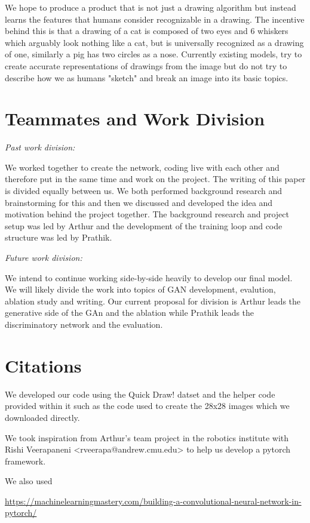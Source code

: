 \documentclass{article}
\begin{document}
We hope to produce a product that is not just a drawing algorithm but instead
learns the features that humans consider recognizable in a drawing. The incentive
behind this is that a drawing of a cat is composed of two eyes and 6 whiskers
which arguably look nothing like a cat, but is universally recognized as a drawing
of one, similarly a pig has two circles as a nose. Currently existing models,
try to create accurate representations of drawings from the image but do not
try to describe how we as humans "sketch" and break an image into its basic
topics.


\section{Teammates and Work Division}

\textit{Past work division:}

We worked together to create the network, coding live with each other and therefore put
in the same time and work on the project. The writing of this paper is divided equally
between us.
We both performed background research and brainstorming for this and then we
discussed and developed the idea and motivation behind the project together.
The background research and project setup was led by Arthur and the development
of the training loop and code structure was led by Prathik.

\textit{Future work division:}

We intend to continue working side-by-side heavily to develop our final model.
We will likely divide the work into topics of GAN development, evalution, ablation study
and writing. Our current proposal for division is Arthur leads the generative side of the GAn and the ablation
while Prathik leads the discriminatory network and the evaluation.

\section{Citations}

We developed our code using the Quick Draw! datset and the helper code provided
within it such as the code used to create the 28x28 images which we downloaded
directly.

We took inspiration from Arthur's team project in the robotics institute with
Rishi Veerapaneni <rveerapa@andrew.cmu.edu> to help us develop a pytorch
framework.

We also used

\begin{center}
  \url{https://machinelearningmastery.com/building-a-convolutional-neural-network-in-pytorch/}
\end{center}
\end{document}
